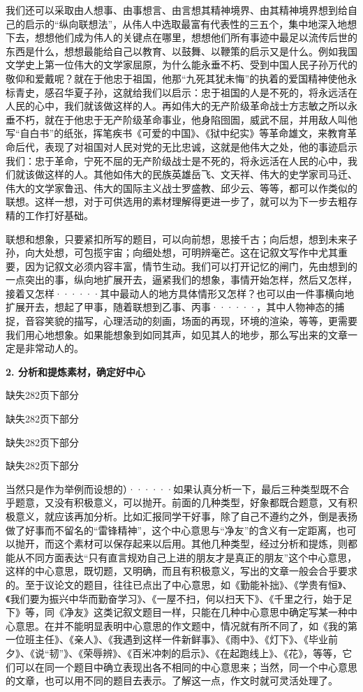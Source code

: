 我们还可以采取由人想事、由事想言、由言想其精神境界、由其精神境界想到给自己的启示的“纵向联想法”，从伟人中选取最富有代表性的三五个，集中地深入地想下去，想想他们成为伟人的关键点在哪里，想想他们所有事迹中最足以流传后世的东西是什么，想想最能给自己以教育、以鼓舞、以鞭策的启示又是什么。例如我国文学史上第一位伟大的文学家屈原，为什么能永垂不朽、受到中国人民子孙万代的敬仰和爱戴呢？就在于他忠于祖国，他那“九死其犹未悔”的执着的爱国精神使他永标青史，感召华夏子孙，这就给我们以启示：忠于祖国的人是不死的，将永远活在人民的心中，我们就该做这样的人。再如伟大的无产阶级革命战士方志敏之所以永垂不朽，就在于他忠于无产阶级革命事业，他身陷囹圄，威武不屈，并用敌人叫他写“自白书”的纸张，挥笔疾书《可爱的中国》、《狱中纪实》等革命雄文，来教育革命后代，表现了对祖国对人民对党的无比忠诚，这就是他伟大之处，他的事迹启示我们：忠于革命，宁死不屈的无产阶级战士是不死的，将永远活在人民的心中，我们就该做这样的人。其他如伟大的民族英雄岳飞、文天祥、伟大的史学家司马迁、伟大的文学家鲁迅、伟大的国际主义战士罗盛教、邱少云、等等，都可以作类似的联想。这样一想，对于可供选用的素材理解得更进一步了，就可以为下一步去粗存精的工作打好基础。

联想和想象，只要紧扣所写的题目，可以向前想，思接千古；向后想，想到未来子孙，向大处想，可包揽宇宙；向细处想，可明辨毫芒。这在记叙文写作中尤其重要，因为记叙文必须内容丰富，情节生动。我们可以打开记忆的闸门，先由想到的一点突出的事，纵向地扩展开去，逼紧我们的想象，事情开始怎样，然后又怎样，接着又怎样······其中最动人的地方具体情形又怎样？也可以由一件事横向地扩展开去，想起了甲事，随着联想到乙事、丙事······，其中人物神态的捕捉，音容笑貌的描写，心理活动的刻画，场面的再现，环境的渲染，等等，更需要我们用心地想象。如果能想象到如同其声，如见其人的地步，那么写出来的文章一定是非常动人的。

\textbf{2. 分析和提炼素材，确定好中心}

缺失282页下部分

缺失282页下部分

缺失282页下部分

缺失282页下部分

\newpage
\noindent
当然只是作为举例而设想的）······如果认真分析一下，最后三种类型既不合乎题意，又没有积极意义，可以抛开。前面的几种类型，好象都既合题意，又有积极意义，就应该再加分析。比如汇报同学干好事，除了自己不遵约之外，倒是表扬做了好事而不留名的“雷锋精神”，这个中心意思与“净友”的含义有一定距离，也可以抛开，而这个素材可以保存起来以后用。其他几种类型，经过分析和提炼，则都能从不同方面表达“只有直言规劝自己上进的朋友才是真正的朋友”这个中心意思，这样的中心意思，既切题，又明确，而且有积极意义，写出的文章一般会合乎要求的。至于议论文的题目，往往已点出了中心意思，如《勤能补拙》、《学贵有恒》、《我们要为振兴中华而勤奋学习》、《一屋不扫，何以扫天下》、《千里之行，始于足下》等，同《净友》这类记叙文题目一样，只能在几种中心意思中确定写某一种中心意思。在并不能明显表明中心意思的作文题中，情况就有所不同了，如《我的第一位班主任》、《亲人》、《我遇到这样一件新鲜事》、《雨中》、《灯下》、《毕业前夕》、《说“韧”》、《荣辱辨》、《百米冲刺的启示》、《在起跑线上》、《花》，等等，它们可以在同一个题目中确立表现出各不相同的中心意思来；当然，同一个中心意思的文章，也可以用不同的题目去表示。了解这一点，作文时就可灵活处理了。

